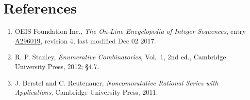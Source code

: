 \documentclass[11pt]{article}
\theoremstyle{definition}
\begin{document}
\section{References}

\begin{enumerate}

\item OEIS Foundation Inc., \emph{The On-Line Encyclopedia of Integer Sequences}, entry \href{https://oeis.org/A296019}{A296019}, revision 4, last modified Dec 02 2017.

\item R. P. Stanley, \emph{Enumerative Combinatorics}, Vol.~1, 2nd ed., Cambridge University Press, 2012; \S4.7.

\item J. Berstel and C. Reutenauer, \emph{Noncommutative Rational Series with Applications}, Cambridge University Press, 2011.

\end{enumerate}
\end{document}
